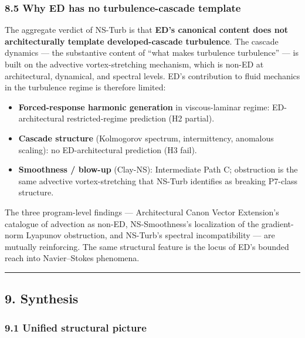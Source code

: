 \documentclass[
  11pt,a4paper]{article}
\providecommand{\tightlist}{%
  \setlength{\itemsep}{0pt}\setlength{\parskip}{0pt}}
\begin{document}
\subsubsection{8.5 Why ED has no turbulence-cascade
template}\label{why-ed-has-no-turbulence-cascade-template}

The aggregate verdict of NS-Turb is that \textbf{ED's canonical content
does not architecturally template developed-cascade turbulence}. The
cascade dynamics --- the substantive content of ``what makes turbulence
turbulence'' --- is built on the advective vortex-stretching mechanism,
which is non-ED at architectural, dynamical, and spectral levels. ED's
contribution to fluid mechanics in the turbulence regime is therefore
limited:

\begin{itemize}
\tightlist
\item
  \textbf{Forced-response harmonic generation} in viscous-laminar
  regime: ED-architectural restricted-regime prediction (H2 partial).
\item
  \textbf{Cascade structure} (Kolmogorov spectrum, intermittency,
  anomalous scaling): no ED-architectural prediction (H3 fail).
\item
  \textbf{Smoothness / blow-up} (Clay-NS): Intermediate Path C;
  obstruction is the same advective vortex-stretching that NS-Turb
  identifies as breaking P7-class structure.
\end{itemize}

The three program-level findings --- Architectural Canon Vector
Extension's catalogue of advection as non-ED, NS-Smoothness's
localization of the gradient-norm Lyapunov obstruction, and NS-Turb's
spectral incompatibility --- are mutually reinforcing. The same
structural feature is the locus of ED's bounded reach into
Navier--Stokes phenomena.

\begin{center}\rule{0.5\linewidth}{0.5pt}\end{center}

\subsection{9. Synthesis}\label{synthesis}

\subsubsection{9.1 Unified structural
picture}\label{unified-structural-picture}
\end{document}
